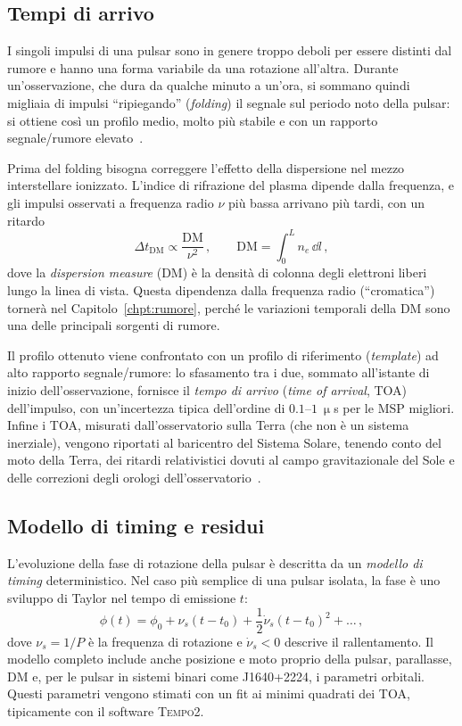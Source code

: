\subsection{Tempi di arrivo}

I singoli impulsi di una pulsar sono in genere troppo deboli per essere distinti dal rumore e hanno una forma variabile da una rotazione all'altra. Durante un'osservazione, che dura da qualche minuto a un'ora, si sommano quindi migliaia di impulsi ``ripiegando'' (\textit{folding}) il segnale sul periodo noto della pulsar: si ottiene così un profilo medio, molto più stabile e con un rapporto segnale/rumore elevato~\cite{Taylor2021}.

Prima del folding bisogna correggere l'effetto della dispersione nel mezzo interstellare ionizzato. L'indice di rifrazione del plasma dipende dalla frequenza, e gli impulsi osservati a frequenza radio $\nu$ più bassa arrivano più tardi, con un ritardo
\begin{equation}
    \Delta t_{\mathrm{DM}} \propto \frac{\mathrm{DM}}{\nu^2}\, , \qquad \mathrm{DM} = \int_0^L n_e\, \dd l \, ,
    \label{eq:ritardo_DM}
\end{equation}
dove la \textit{dispersion measure} (DM) è la densità di colonna degli elettroni liberi lungo la linea di vista. Questa dipendenza dalla frequenza radio (``cromatica'') tornerà nel Capitolo~\ref{chpt:rumore}, perché le variazioni temporali della DM sono una delle principali sorgenti di rumore.

Il profilo ottenuto viene confrontato con un profilo di riferimento (\textit{template}) ad alto rapporto segnale/rumore: lo sfasamento tra i due, sommato all'istante di inizio dell'osservazione, fornisce il \textit{tempo di arrivo} (\textit{time of arrival}, TOA) dell'impulso, con un'incertezza tipica dell'ordine di $0.1$--$1\ \upmu$s per le MSP migliori. Infine i TOA, misurati dall'osservatorio sulla Terra (che non è un sistema inerziale), vengono riportati al baricentro del Sistema Solare, tenendo conto del moto della Terra, dei ritardi relativistici dovuti al campo gravitazionale del Sole e delle correzioni degli orologi dell'osservatorio~\cite{Taylor2021}.

\subsection{Modello di timing e residui}

L'evoluzione della fase di rotazione della pulsar è descritta da un \textit{modello di timing} deterministico. Nel caso più semplice di una pulsar isolata, la fase è uno sviluppo di Taylor nel tempo di emissione $t$:
\begin{equation}
    \phi(t) = \phi_0 + \nu_s (t - t_0) + \frac{1}{2}\dot{\nu}_s (t - t_0)^2 + \dots \, ,
    \label{eq:fase_pulsar}
\end{equation}
dove $\nu_s = 1/P$ è la frequenza di rotazione e $\dot{\nu}_s < 0$ descrive il rallentamento. Il modello completo include anche posizione e moto proprio della pulsar, parallasse, DM e, per le pulsar in sistemi binari come J1640+2224, i parametri orbitali. Questi parametri vengono stimati con un fit ai minimi quadrati dei TOA, tipicamente con il software \textsc{Tempo2}.

